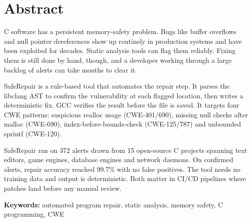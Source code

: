\chapter*{Abstract}

C software has a persistent memory-safety problem. Bugs like buffer overflows and null pointer dereferences show up routinely in production systems and have been exploited for decades. Static analysis tools can flag them reliably. Fixing them is still done by hand, though, and a developer working through a large backlog of alerts can take months to clear it.

SafeRepair is a rule-based tool that automates the repair step. It parses the libclang AST to confirm the vulnerability at each flagged location, then writes a deterministic fix. GCC verifies the result before the file is saved. It targets four CWE patterns: suspicious realloc usage (CWE-401/690), missing null checks after malloc (CWE-690), index-before-bounds-check (CWE-125/787) and unbounded sprintf (CWE-120).

SafeRepair ran on 372 alerts drawn from 15 open-source C projects spanning text editors, game engines, database engines and network daemons. On confirmed alerts, repair accuracy reached 99.7\% with no false positives. The tool needs no training data and output is deterministic. Both matter in CI/CD pipelines where patches land before any manual review.

\vspace{0.8cm}

\textbf{Keywords:} automated program repair, static analysis, memory safety, C programming, CWE

